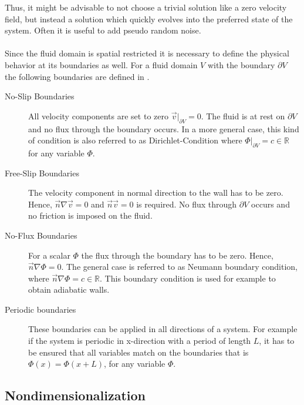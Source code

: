 Thus, it might be advisable to not choose a trivial solution like a zero velocity field, but instead a solution which quickly evolves into the preferred state
of the system. Often it is useful to add pseudo random noise.\\
\\
Since the fluid domain is spatial restricted it is necessary to define the physical behavior at its boundaries as well.
For a fluid domain $V$ with the boundary $\partial V$ the following boundaries are defined in \citep{Griebel199, ferziger99}.

\begin{description}
    \item[No-Slip Boundaries] All velocity components are set to zero $\vec{v}|_{\partial V} = 0$. The fluid is at rest on $\partial V$ and no flux through
                              the boundary occurs.
                              In a more general case, this kind of condition is  also referred to as Dirichlet-Condition where $\Phi|_{\partial V} = c\in\mathbb{R}$
                              for any variable $\Phi$.

    \item[Free-Slip Boundaries] The velocity component in normal direction to the wall has to be zero. Hence, $\vec{n} \nabla \vec{v} = 0$ and $\vec{n}\vec{v}=0$ is required.
                                No flux through $\partial V$ occurs and no friction is imposed on the fluid.

    \item[No-Flux Boundaries] For a scalar $\Phi$ the flux through the boundary has to be zero. Hence, $\vec{n}\nabla \Phi = 0$.
                              The general case is referred to as Neumann boundary condition, where $\vec{n}\nabla \Phi = c\in \mathbb{R}$.
                              This boundary condition is used for example to obtain adiabatic walls.

    \item[Periodic boundaries] These boundaries can be applied in all directions of a system. For example if the system is periodic in x-direction with a period of length $L$,
                               it has to be ensured that all variables match on the boundaries that is $\Phi(x) = \Phi(x + L)$, for any variable $\Phi$.
\end{description}

\clearpage

\subsection{Nondimensionalization}

